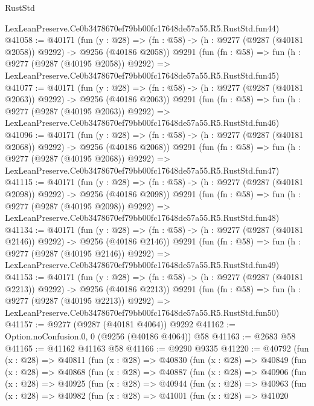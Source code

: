 \begin{lexlean}{RustStd}
\begin{coremodule}
    LexLeanPreserve.Ce0b3478670ef79bb00fc17648de57a55.R5.RustStd.fun44)
@41058 := @40171
    (fun (y : @28) =>
    (fn : @58) -> (h : @9277 (@9287 (@40181 @2058)) @9292) -> @9256 (@40186 @2058))
    @9291
    (fun (fn : @58) =>
    fun (h : @9277 (@9287 (@40195 @2058)) @9292) =>
    LexLeanPreserve.Ce0b3478670ef79bb00fc17648de57a55.R5.RustStd.fun45)
@41077 := @40171
    (fun (y : @28) =>
    (fn : @58) -> (h : @9277 (@9287 (@40181 @2063)) @9292) -> @9256 (@40186 @2063))
    @9291
    (fun (fn : @58) =>
    fun (h : @9277 (@9287 (@40195 @2063)) @9292) =>
    LexLeanPreserve.Ce0b3478670ef79bb00fc17648de57a55.R5.RustStd.fun46)
@41096 := @40171
    (fun (y : @28) =>
    (fn : @58) -> (h : @9277 (@9287 (@40181 @2068)) @9292) -> @9256 (@40186 @2068))
    @9291
    (fun (fn : @58) =>
    fun (h : @9277 (@9287 (@40195 @2068)) @9292) =>
    LexLeanPreserve.Ce0b3478670ef79bb00fc17648de57a55.R5.RustStd.fun47)
@41115 := @40171
    (fun (y : @28) =>
    (fn : @58) -> (h : @9277 (@9287 (@40181 @2098)) @9292) -> @9256 (@40186 @2098))
    @9291
    (fun (fn : @58) =>
    fun (h : @9277 (@9287 (@40195 @2098)) @9292) =>
    LexLeanPreserve.Ce0b3478670ef79bb00fc17648de57a55.R5.RustStd.fun48)
@41134 := @40171
    (fun (y : @28) =>
    (fn : @58) -> (h : @9277 (@9287 (@40181 @2146)) @9292) -> @9256 (@40186 @2146))
    @9291
    (fun (fn : @58) =>
    fun (h : @9277 (@9287 (@40195 @2146)) @9292) =>
    LexLeanPreserve.Ce0b3478670ef79bb00fc17648de57a55.R5.RustStd.fun49)
@41153 := @40171
    (fun (y : @28) =>
    (fn : @58) -> (h : @9277 (@9287 (@40181 @2213)) @9292) -> @9256 (@40186 @2213))
    @9291
    (fun (fn : @58) =>
    fun (h : @9277 (@9287 (@40195 @2213)) @9292) =>
    LexLeanPreserve.Ce0b3478670ef79bb00fc17648de57a55.R5.RustStd.fun50)
@41157 := @9277 (@9287 (@40181 @4064)) @9292
@41162 := Option.noConfusion.{0, 0} (@9256 (@40186 @4064)) @58
@41163 := @2683 @58
@41165 := @41162 @41163 @58
@41166 := @9290 @9335
@41220 := @40792
    (fun (x : @28) =>
    @40811
      (fun (x : @28) =>
      @40830
        (fun (x : @28) =>
        @40849
          (fun (x : @28) =>
          @40868
            (fun (x : @28) =>
            @40887
              (fun (x : @28) =>
              @40906
                (fun (x : @28) =>
                @40925
                  (fun (x : @28) =>
                  @40944
                    (fun (x : @28) =>
                    @40963
                      (fun (x : @28) =>
                      @40982
                        (fun (x : @28) =>
                        @41001
                          (fun (x : @28) =>
                          @41020

\end{coremodule}
\end{lexlean}
